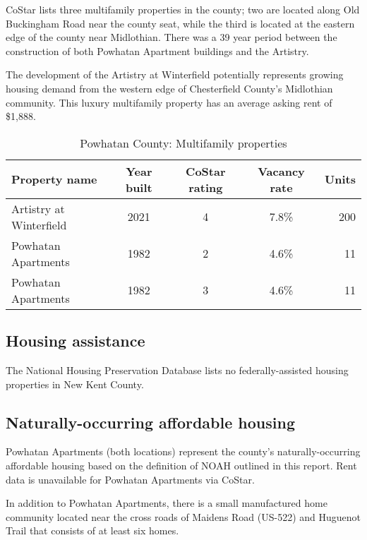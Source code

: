 \documentclass[
  letterpaper,
  DIV=11,
  numbers=noendperiod]{scrreprt}
\begin{document}
CoStar lists three multifamily properties in the county; two are located
along Old Buckingham Road near the county seat, while the third is
located at the eastern edge of the county near Midlothian. There was a
39 year period between the construction of both Powhatan Apartment
buildings and the Artistry.

The development of the Artistry at Winterfield potentially represents
growing housing demand from the western edge of Chesterfield County's
Midlothian community. This luxury multifamily property has an average
asking rent of \$1,888.

\hypertarget{tbl-mf-list}{}
\begin{table}
\caption{\label{tbl-mf-list}Powhatan County: Multifamily properties }\tabularnewline

\centering
\begin{tabular}{l|c|c|c|r}
\hline
Property name & Year built & CoStar rating & Vacancy rate & Units\\
\hline
Artistry at Winterfield & 2021 & 4 & 7.8\% & 200\\
\hline
Powhatan Apartments & 1982 & 2 & 4.6\% & 11\\
\hline
Powhatan Apartments & 1982 & 3 & 4.6\% & 11\\
\hline
\end{tabular}
\end{table}

\hypertarget{housing-assistance-6}{%
\subsection{Housing assistance}\label{housing-assistance-6}}

The National Housing Preservation Database lists no federally-assisted
housing properties in New Kent County.

\hypertarget{naturally-occurring-affordable-housing-7}{%
\subsection{Naturally-occurring affordable
housing}\label{naturally-occurring-affordable-housing-7}}

Powhatan Apartments (both locations) represent the county's
naturally-occurring affordable housing based on the definition of NOAH
outlined in this report. Rent data is unavailable for Powhatan
Apartments via CoStar.

In addition to Powhatan Apartments, there is a small manufactured home
community located near the cross roads of Maidens Road (US-522) and
Huguenot Trail that consists of at least six homes.
\end{document}
